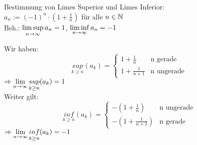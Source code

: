 \documentclass[../ana1u.tex]{subfiles}
\begin{document}
\begin{bsp}
    Bestimmung von Limes Superior und Limes Inferior: \\
    \(a_n := (-1)^n \cdot (1 + \frac{1}{n}) \) für alle \(n \in \mathbb{N} \) \\
    Beh.: \(\limsup\limits_{n\rightarrow\infty} a_n = 1 \), \(\liminf\limits_{n\rightarrow\infty} a_n = -1 \)
    \begin{bew}
        Wir haben:
        \[\underset{k \geq n}{sup} (a_k) =\begin{cases}
        1 + \frac{1}{n} & \text{n gerade} \\
        1 + \frac{1}{n + 1} & \text{n ungerade}
        \end{cases} \]
        \(\Rightarrow \lim\limits_{n\rightarrow\infty} \underset{k \geq n}{sup} (a_k) = 1\) \\
        Weiter gilt:
        \[\underset{k \geq n}{inf} (a_k) =\begin{cases}
        -(1 + \frac{1}{n} )& \text{n ungerade} \\
        -(1 + \frac{1}{n + 1}) & \text{n gerade}
        \end{cases} \]
        \(\Rightarrow \lim\limits_{n\rightarrow\infty} \underset{k \geq n}{inf} (a_k) = -1 \) \\
    \end{bew}
\end{bsp}
\end{document}
